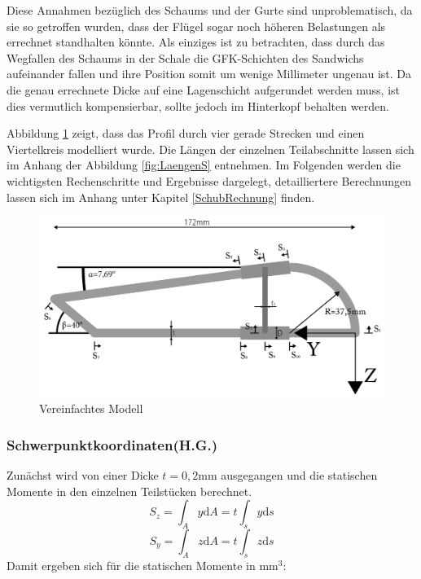 \noindent 
Diese Annahmen bezüglich des Schaums und der Gurte sind unproblematisch, da sie so getroffen wurden, dass der Flügel sogar noch höheren Belastungen als errechnet standhalten könnte. Als einziges ist zu betrachten, dass durch das Wegfallen des Schaums in der Schale die GFK-Schichten des Sandwichs aufeinander fallen und ihre Position somit um wenige Millimeter ungenau ist. Da die genau errechnete Dicke auf eine Lagenschicht aufgerundet werden muss, ist dies vermutlich kompensierbar, sollte jedoch im Hinterkopf behalten werden.

\noindent Abbildung \ref{Fluegel1} zeigt, dass das Profil durch vier gerade Strecken und einen Viertelkreis modelliert wurde. Die Längen der einzelnen Teilabschnitte lassen sich im Anhang der Abbildung \ref{fig:LaengenS} entnehmen.
Im Folgenden werden die wichtigsten Rechenschritte und Ergebnisse dargelegt, detailliertere Berechnungen lassen sich im Anhang unter Kapitel \ref{SchubRechnung} finden.
\begin{figure}[h]
 \centering
 \includegraphics[width=1\textwidth]{Bilder/Model1}
 \caption{Vereinfachtes Modell}
 \label{Fluegel1}
\end{figure}
\subsubsection{Schwerpunktkoordinaten(H.G.)}\label{SP-Koord}
Zunächst wird von einer Dicke $t=0,2\mathrm{mm}$ ausgegangen und die statischen Momente in den einzelnen Teilstücken berechnet.
\begin{equation}\label{SM1}
	S_{z}=\int_{A}^{}y \mathrm{d}A =t\int_{s}^{}y \mathrm{d}s
\end{equation}
\begin{equation}\label{SM2}
	S_{y}=\int_{A}^{}z \mathrm{d}A =t\int_{s}^{}z \mathrm{d}s 
\end{equation}
Damit ergeben sich für die statischen Momente in $\mathrm{mm}^3$:

